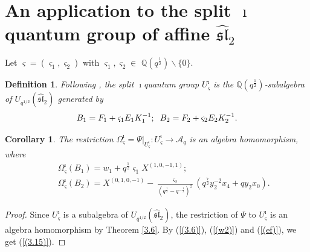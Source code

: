 \documentclass[reqno,11pt]{amsart}
\numberwithin{equation}{section}
\newtheorem{corollary}[theorem]{Corollary}
\newtheorem{definition}[theorem]{Definition}
\begin{document}
\section{An application to the split $\imath$quantum group of affine $\widehat {\mathfrak{sl}}_2$} Let $\boldsymbol{\varsigma}=\left(\varsigma_1, \varsigma_2\right)$ with $\varsigma_1, \varsigma_2 \in$ $\mathbb{Q}(q^{\frac{1}{2}}) \backslash\{0\}$.
\begin{definition}\label{4.1}
	 Following \cite{Let99,Ko14}, the split $\imath$quantum group $U_{\varsigma}^{\imath}$ is the $\mathbb{Q}(q^{\frac{1}{2}})$-subalgebra of $U_{q^{1/2}}(\widehat{\mathfrak{s l}}_2)$ generated by
\begin{eqnarray*}
	B_1=F_1+\varsigma_1 E_1 K_1^{-1};\hspace{0.2cm}
	 B_2=F_2+\varsigma_2 E_2 K_2^{-1} .
	\end{eqnarray*}
\end{definition}

\begin{corollary}\label{3.10}
	 The restriction $\Omega_{\varsigma}^{\imath}=\left.\Psi\right|_{U_{\varsigma}^{\imath}}: U_{\varsigma}^{\imath} \longrightarrow \mathcal{A}_q $ is an algebra homomorphism, where
\begin{eqnarray}
	&&\Omega_{\varsigma}^{\imath}\left(B_1\right)=w_1+q^{\frac{1}{2}} \varsigma_1 X^{(1,0,-1,1)};\nonumber \\
	 &&\Omega_{\boldsymbol{\varsigma}}^{\imath}\left(B_2\right)=X^{(0,1,0,-1)}-\frac{\varsigma_2}{\left(q^{\frac{1}{2}}-q^{-\frac{1}{2}}\right)^2}\left(q^{\frac{7}{2}} y_2^{-2} x_4+q y_2 x_0\right) . \label{(3.15)}
	\end{eqnarray}
\end{corollary}
\begin{proof}
	 Since $U_{\varsigma}^{\imath}$ is a subalgebra of $U_{q^{1/2}}(\widehat{\mathfrak{s l}}_2)$, the restriction of $\Psi$ to $U_{\varsigma}^{\imath}$ is an algebra homomorphism by Theorem \ref{3.6}. By (\ref{(3.6)}), (\ref{(w2)}) and (\ref{(ef)}), we get  (\ref{(3.15)}).
\end{proof}
\end{document}
